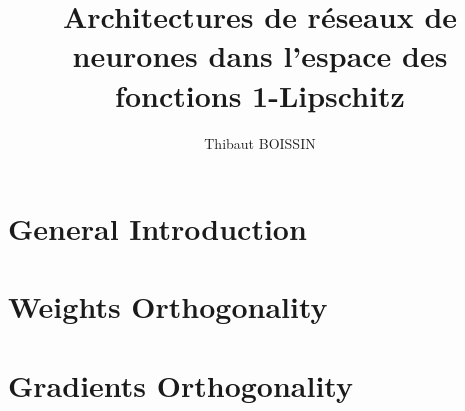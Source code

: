 \documentclass[11pt,a4paper,oneside,table]{memoir}
\title{\textbf{\large Architectures de r\'eseaux de neurones dans l'espace des fonctions 1-Lipschitz}}
\author{Thibaut BOISSIN}
\begin{document}
    \makeflyleaf
    
    \frontmatter
    
    
    
    
    
    \tableofcontents
    
    \mainmatter
    
    \part{General Introduction}
    
    
    \part{Weights Orthogonality}
    
    
    
    
    \part{Gradients Orthogonality}
    
    
    
    
    
    \appendix
    
    
    
    
    
    \backmatter
    \printbibliography
\end{document}
